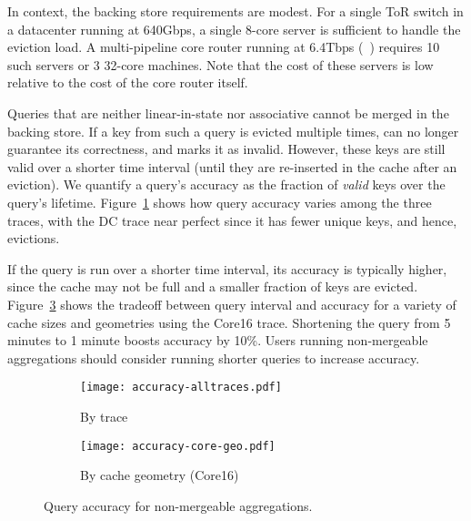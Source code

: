In context, the backing store requirements are modest. For a single ToR switch in a datacenter running at 640Gbps, a single 8-core server is sufficient to handle the eviction load. A multi-pipeline core router running at 6.4Tbps (\eg~\cite{tofino}) requires 10 such servers or 3 32-core machines. Note that the cost of these servers is low relative to the cost of the core router itself.

Queries that are neither linear-in-state nor associative cannot be merged in the
backing store. If a key from such a query is evicted multiple times, \TheSystem
can no longer guarantee its correctness, and marks it as invalid. However, these
keys are still valid over a shorter time interval (until they are re-inserted in the
cache after an eviction). We quantify a query's accuracy as the fraction
of \emph{valid} keys over the query's lifetime. Figure~\ref{fig:accuracy-traces}
shows how query accuracy varies among the three traces, with the DC trace
near perfect since it has fewer unique keys, and hence, evictions.

If the query is run over a shorter time interval, its accuracy is typically higher, since the cache may not be full and a smaller fraction of keys are evicted. 
Figure~\ref{fig:accuracy-time} shows the tradeoff between query interval and accuracy for a variety of cache sizes and geometries using the Core16 trace.
Shortening the query from 5 minutes to 1 minute boosts accuracy by 10\%. Users running non-mergeable aggregations should consider running shorter queries to increase accuracy.

\begin{figure}[ht]
\centering
\vspace{-0.1in}
\begin{subfigure}[t]{0.48\columnwidth}
\raggedright
\texttt{[image: accuracy-alltraces.pdf]}
\caption{By trace}
\label{fig:accuracy-traces}
\end{subfigure}
\begin{subfigure}[t]{0.48\columnwidth}
\raggedleft
\texttt{[image: accuracy-core-geo.pdf]}
\caption{By cache geometry (Core16)}
\label{fig:accuracy-time}
\end{subfigure}
\caption{Query accuracy for non-mergeable aggregations.}
\end{figure}
